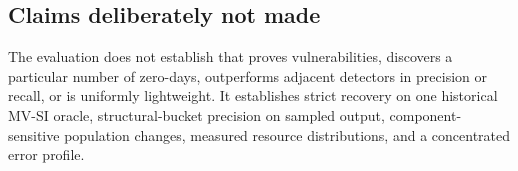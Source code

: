 \subsection{Claims deliberately not made}
\label{s:limitations-claims}

The evaluation does not establish that \sys proves vulnerabilities, discovers a particular number of zero-days, outperforms adjacent detectors in precision or recall, or is uniformly lightweight. It establishes strict recovery on one historical MV-SI oracle, structural-bucket precision on sampled output, component-sensitive population changes, measured resource distributions, and a concentrated error profile.
